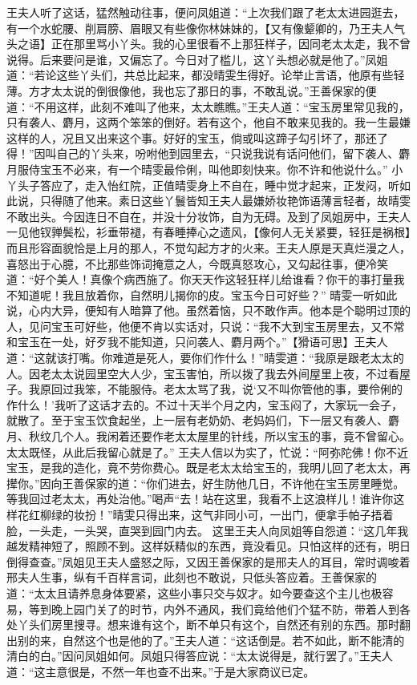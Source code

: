 \documentclass[12pt,oneside]{book}
\begin{document}
王夫人听了这话，猛然触动往事，便问凤姐道：“上次我们跟了老太太进园逛去，有一个水蛇腰、削肩膀、眉眼又有些像你林妹妹的，【又有像颦卿的，乃王夫人气头之语】正在那里骂小丫头。我的心里很看不上那狂样子，因同老太太走，我不曾说得。后来要问是谁，又偏忘了。今日对了槛儿，这丫头想必就是他了。”凤姐道：“若论这些丫头们，共总比起来，都没晴雯生得好。论举止言语，他原有些轻薄。方才太太说的倒很像他，我也忘了那日的事，不敢乱说。”王善保家的便道：“不用这样，此刻不难叫了他来，太太瞧瞧。”王夫人道：“宝玉房里常见我的，只有袭人、麝月，这两个笨笨的倒好。若有这个，他自不敢来见我的。我一生最嫌这样的人，况且又出来这个事。好好的宝玉，倘或叫这蹄子勾引坏了，那还了得！”因叫自己的丫头来，吩咐他到园里去，“只说我说有话问他们，留下袭人、麝月服侍宝玉不必来，有一个晴雯最伶俐，叫他即刻快来。你不许和他说什么。”
小丫头子答应了，走入怡红院，正值晴雯身上不自在，睡中觉才起来，正发闷，听如此说，只得随了他来。素日这些丫鬟皆知王夫人最嫌娇妆艳饰语薄言轻者，故晴雯不敢出头。今因连日不自在，并没十分妆饰，自为无碍。及到了凤姐房中，王夫人一见他钗亸鬓松，衫垂带褪，有春睡捧心之遗风，【像何人无关紧要，轻狂是祸根】而且形容面貌恰是上月的那人，不觉勾起方才的火来。王夫人原是天真烂漫之人，喜怒出于心臆，不比那些饰词掩意之人，今既真怒攻心，又勾起往事，便冷笑道：“好个美人！真像个病西施了。你天天作这轻狂样儿给谁看？你干的事打量我不知道呢！我且放着你，自然明儿揭你的皮。宝玉今日可好些？”
晴雯一听如此说，心内大异，便知有人暗算了他。虽然着恼，只不敢作声。他本是个聪明过顶的人，见问宝玉可好些，他便不肯以实话对，只说：“我不大到宝玉房里去，又不常和宝玉在一处，好歹我不能知道，只问袭人、麝月两个。”【猾语可思】王夫人道：“这就该打嘴。你难道是死人，要你们作什么！”晴雯道：“我原是跟老太太的人。因老太太说园里空大人少，宝玉害怕，所以拨了我去外间屋里上夜，不过看屋子。我原回过我笨，不能服侍。老太太骂了我，说‘又不叫你管他的事，要伶俐的作什么！’我听了这话才去的。不过十天半个月之内，宝玉闷了，大家玩一会子，就散了。至于宝玉饮食起坐，上一层有老奶奶、老妈妈们，下一层又有袭人、麝月、秋纹几个人。我闲着还要作老太太屋里的针线，所以宝玉的事，竟不曾留心。太太既怪，从此后我留心就是了。”
王夫人信以为实了，忙说：“阿弥陀佛！你不近宝玉，是我的造化，竟不劳你费心。既是老太太给宝玉的，我明儿回了老太太，再撵你。”因向王善保家的道：“你们进去，好生防他几日，不许他在宝玉房里睡觉。等我回过老太太，再处治他。”喝声“去！站在这里，我看不上这浪样儿！谁许你这样花红柳绿的妆扮！”晴雯只得出来，这气非同小可，一出门，便拿手帕子捂着脸，一头走，一头哭，直哭到园门内去。
这里王夫人向凤姐等自怨道：“这几年我越发精神短了，照顾不到。这样妖精似的东西，竟没看见。只怕这样的还有，明日倒得查查。”凤姐见王夫人盛怒之际，又因王善保家的是邢夫人的耳目，常时调唆着邢夫人生事，纵有千百样言词，此刻也不敢说，只低头答应着。王善保家的道：“太太且请养息身体要紧，这些小事只交与奴才。如今要查这个主儿也极容易，等到晚上园门关了的时节，内外不通风，我们竟给他们个猛不防，带着人到各处丫头们房里搜寻。想来谁有这个，断不单只有这个，自然还有别的东西。那时翻出别的来，自然这个也是他的了。”王夫人道：“这话倒是。若不如此，断不能清的清白的白。”因问凤姐如何。凤姐只得答应说：“太太说得是，就行罢了。”王夫人道：“这主意很是，不然一年也查不出来。”于是大家商议已定。
\end{document}
